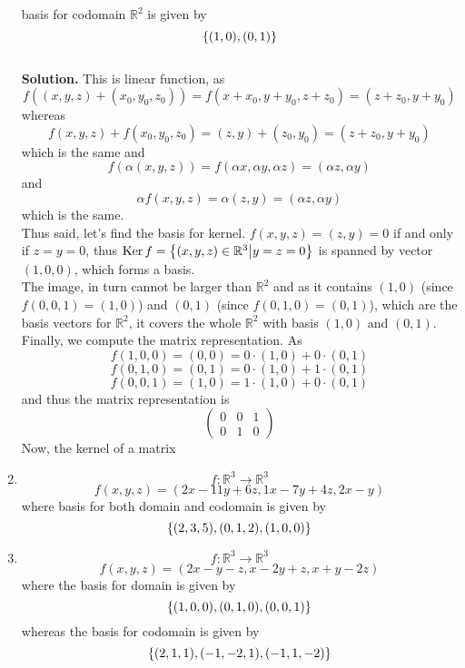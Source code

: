 \documentclass[12pt]{article} %
\begin{document}
\begin{enumerate}
	basis for codomain $\mathbb{R}^2$ is given by
	\[\left\{(1,0),(0,1)\right\}\]
	\\\textbf{Solution.} This is linear function, as
	\[f((x,y,z)+(x_0,y_0,z_0))=f(x+x_0,y+y_0,z+z_0)=(z+z_0,y+y_0)\]
	whereas 
	\[f(x,y,z)+f(x_0,y_0,z_0)=(z,y)+(z_0,y_0)=(z+z_0,y+y_0)\]
	which is the same and
	\[f(\alpha(x,y,z))=f(\alpha x,\alpha y,\alpha z)=(\alpha z,\alpha y)\]
	and
	\[\alpha f(x,y,z)=\alpha(z,y)=(\alpha z,\alpha y)\]
	which is the same.\\
	Thus said, let's find the basis for kernel. $f(x,y,z)=(z,y)=0$ if and only if $z=y=0$, thus
	$\operatorname{Ker} f=\left\{(x,y,z)\in\mathbb{R}^3\big| y=z=0\right\}$ is spanned by vector $(1,0,0)$, which forms a basis.\\
	The image, in turn cannot be larger than $\mathbb{R}^2$ and as it contains $(1,0)$ (since $f(0,0,1)=(1,0)$)
	and $(0,1)$ (since $f(0,1,0)=(0,1)$), which are the basis vectors for $\mathbb{R}^2$, it covers the whole $\mathbb{R}^2$
	with basis $(1,0)$ and $(0,1)$.\\
	Finally, we compute the matrix representation. As
	\[f(1,0,0)=(0,0)=0\cdot(1,0)+0\cdot(0,1)\]
	\[f(0,1,0)=(0,1)=0\cdot(1,0)+1\cdot(0,1)\]
	\[f(0,0,1)=(1,0)=1\cdot(1,0)+0\cdot(0,1)\]
	and thus the matrix representation is
	\[\begin{pmatrix}0&0&1\\0&1&0\end{pmatrix}\]
	Now, the kernel of a matrix
\item \[f:\mathbb{R}^3\to\mathbb{R}^3\]%
	\[f(x,y,z)=(2x-11y+6z,1x-7y+4z,2x-y)\]
	where basis for both domain and codomain is given by
	\[\left\{(2,3,5),(0,1,2),(1,0,0)\right\}\]
\item \[f:\mathbb{R}^3\to\mathbb{R}^3\]%
	\[f(x,y,z)=(2x-y-z,x-2y+z,x+y-2z)\]
	where the basis for domain is given by
	\[\left\{(1,0,0),(0,1,0),(0,0,1)\right\}\]
	whereas the basis for codomain is given by
	\[\left\{(2,1,1),(-1,-2,1),(-1,1,-2)\right\}\]


\end{enumerate}
\end{document}
